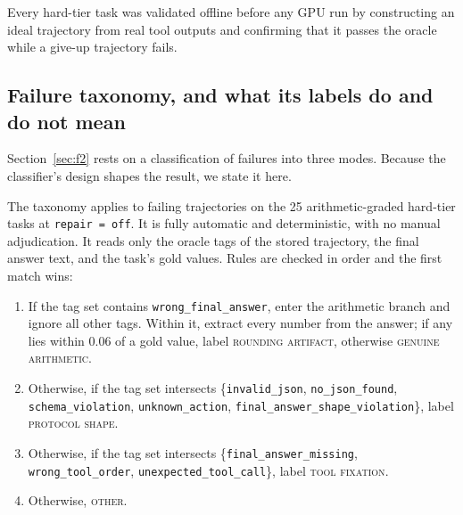 \documentclass[11pt]{article}
\begin{document}
Every hard-tier task was validated offline before any GPU run by constructing an ideal trajectory from real tool outputs and confirming that it passes the oracle while a give-up trajectory fails.

\subsection{Failure taxonomy, and what its labels do and do not mean}
\label{sec:taxonomy}

Section~\ref{sec:f2} rests on a classification of failures into three modes. Because the classifier's design shapes the result, we state it here.

The taxonomy applies to failing trajectories on the 25 arithmetic-graded hard-tier tasks at \texttt{repair\,=\,off}. It is fully automatic and deterministic, with no manual adjudication. It reads only the oracle tags of the stored trajectory, the final answer text, and the task's gold values. Rules are checked in order and the first match wins:

\begin{sloppypar}
\begin{enumerate}
  \item If the tag set contains \texttt{wrong\_final\_answer}, enter the arithmetic branch and ignore all other tags. Within it, extract every number from the answer; if any lies within $0.06$ of a gold value, label \textsc{rounding artifact}, otherwise \textsc{genuine arithmetic}.
  \item Otherwise, if the tag set intersects \{\texttt{invalid\_\allowbreak{}json}, \texttt{no\_\allowbreak{}json\_\allowbreak{}found}, \texttt{schema\_\allowbreak{}violation}, \texttt{unknown\_\allowbreak{}action}, \texttt{final\_\allowbreak{}answer\_\allowbreak{}shape\_\allowbreak{}violation}\}, label \textsc{protocol shape}.
  \item Otherwise, if the tag set intersects \{\texttt{final\_\allowbreak{}answer\_\allowbreak{}missing}, \texttt{wrong\_\allowbreak{}tool\_\allowbreak{}order}, \texttt{unexpected\_\allowbreak{}tool\_\allowbreak{}call}\}, label \textsc{tool fixation}.
  \item Otherwise, \textsc{other}.
\end{enumerate}
\end{sloppypar}
\end{document}
